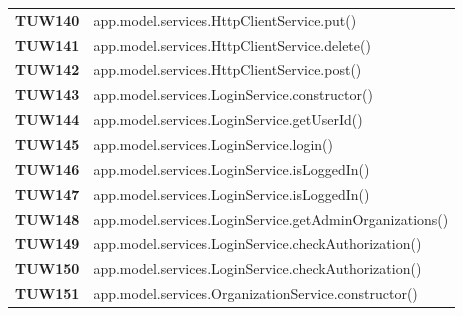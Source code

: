 \documentclass[../../piano-di-qualifica.tex]{subfiles}
\begin{document}
\begin{longtable}[H]{>{\centering\bfseries}m{3cm} >{}m{13cm}}
  TUW140             & app.model.services.HttpClientService.put\@()                                                            \\

  TUW141             & app.model.services.HttpClientService.delete\@()                                                         \\

  TUW142             & app.model.services.HttpClientService.post\@()                                                           \\




  TUW143             & app.model.services.LoginService.constructor\@()                                                         \\

  TUW144             & app.model.services.LoginService.getUserId\@()                                                           \\

  TUW145             & app.model.services.LoginService.login\@()                                                               \\

  TUW146             & app.model.services.LoginService.isLoggedIn\@()                                                          \\

  TUW147             & app.model.services.LoginService.isLoggedIn\@()                                                          \\

  TUW148             & app.model.services.LoginService.getAdminOrganizations\@()                                               \\

  TUW149             & app.model.services.LoginService.checkAuthorization\@()                                                  \\

  TUW150             & app.model.services.LoginService.checkAuthorization\@()                                                  \\


  TUW151             & app.model.services.OrganizationService.constructor\@()                                                  \\


\end{longtable}
\end{document}
